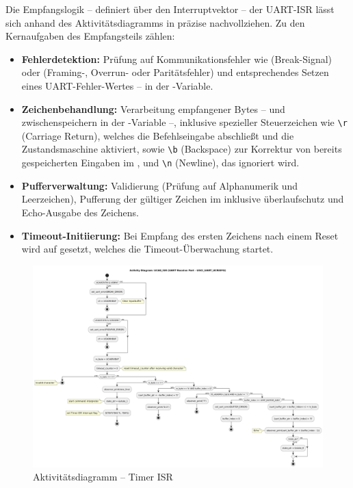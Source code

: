 Die Empfangslogik -- definiert \"uber den Interruptvektor  -- der UART-ISR l\"asst sich anhand des Aktivit\"atsdiagramms in  pr\"azise nachvollziehen. Zu den Kernaufgaben des Empfangsteils z\"ahlen:

\begin{itemize}
	\item \textbf{Fehlerdetektion:} Pr\"ufung auf Kommunikationsfehler wie  (Break-Signal) oder  (Framing-, Overrun- oder Parit\"atsfehler) und entsprechendes Setzen eines UART-Fehler-Wertes -- in der -Variable. 
	
	\item \textbf{Zeichenbehandlung:} Verarbeitung empfangener Bytes -- und zwischenspeichern in der -Variable --, inklusive spezieller Steuerzeichen wie \glqq{}\texttt{\textbackslash r}\grqq{} (Carriage Return), welches die Befehlseingabe abschlie{\ss}t und die Zustandsmaschine aktiviert, sowie \glqq{}\texttt{\textbackslash b}\grqq{} (Backspace) zur Korrektur von bereits gespeicherten Eingaben im , und \glqq{}\texttt{\textbackslash n}\grqq{} (Newline), das ignoriert wird.

	\item \textbf{Pufferverwaltung:} Validierung (Pr\"ufung auf Alphanumerik und Leerzeichen), Pufferung der g\"ultiger Zeichen im  inklusive \"uberlaufschutz und Echo-Ausgabe des Zeichens.

	\item \textbf{Timeout-Initiierung:} Bei Empfang des ersten Zeichens nach einem Reset wird  auf  gesetzt, welches die Timeout-\"Uberwachung startet.
\end{itemize}

\newpage
\begin{figure}[h!]
	\centering
	\includegraphics[angle=270, width=1.0\textwidth]{../Bilder/observer_activity_diagram_eusci_receive.png}
	\caption{Aktivit\"atsdiagramm -- Timer ISR}
	\label{fig:activity_diagram_uart_isr_rec}
\end{figure}


